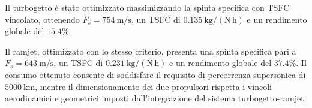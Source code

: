 \documentclass{Configuration_Files/PoliMi3i_thesis}
\begin{document}
Il turbogetto è stato ottimizzato massimizzando la spinta specifica con
TSFC vincolato, ottenendo $F_s=754\ \mathrm{m/s}$, un TSFC di
$0.135\ \mathrm{kg/(N\,h)}$ e un rendimento globale del $15.4\%$.

Il ramjet, ottimizzato con lo stesso criterio, presenta una spinta specifica pari a
$F_s=643\ \mathrm{m/s}$, un TSFC di
$0.231\ \mathrm{kg/(N\,h)}$ e un rendimento globale del $37.4\%$.
Il consumo ottenuto consente di soddisfare il requisito di percorrenza
supersonica di $5000\ \mathrm{km}$, mentre il dimensionamento dei due
propulsori rispetta i vincoli aerodinamici e geometrici imposti
dall'integrazione del sistema turbogetto-ramjet.

\thispagestyle{empty}
\tableofcontents %
\thispagestyle{empty}
\cleardoublepage
\end{document}
